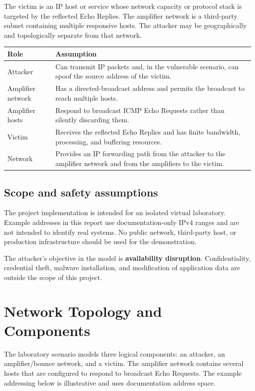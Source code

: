 \documentclass[12pt,a4paper]{article}
\begin{document}
The victim is an IP host or service whose network capacity or protocol stack is targeted by the reflected Echo Replies. The amplifier network is a third-party subnet containing multiple responsive hosts. The attacker may be geographically and topologically separate from that network.

\begin{center}
\small
\begin{tabular}{@{}p{3.6cm} p{11.8cm}@{}}
\hline
\textbf{Role} & \textbf{Assumption}\\
\hline
Attacker & Can transmit IP packets and, in the vulnerable scenario, can spoof the source address of the victim.\\
Amplifier network & Has a directed-broadcast address and permits the broadcast to reach multiple hosts.\\
Amplifier hosts & Respond to broadcast ICMP Echo Requests rather than silently discarding them.\\
Victim & Receives the reflected Echo Replies and has finite bandwidth, processing, and buffering resources.\\
Network & Provides an IP forwarding path from the attacker to the amplifier network and from the amplifiers to the victim.\\
\hline
\end{tabular}
\end{center}

\subsection{Scope and safety assumptions}
The project implementation is intended for an isolated virtual laboratory. Example addresses in this report use documentation-only IPv4 ranges and are not intended to identify real systems. No public network, third-party host, or production infrastructure should be used for the demonstration.

The attacker's objective in the model is \textbf{availability disruption}. Confidentiality, credential theft, malware installation, and modification of application data are outside the scope of this project.

\section{Network Topology and Components}
The laboratory scenario models three logical components: an attacker, an amplifier/bounce network, and a victim. The amplifier network contains several hosts that are configured to respond to broadcast Echo Requests. The example addressing below is illustrative and uses documentation address space.
\end{document}
